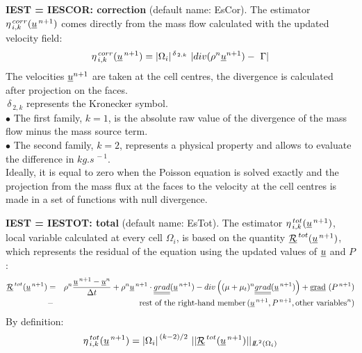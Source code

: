 {\bf IEST = IESCOR: correction}  (default name: EsCor).      
The estimator $ \eta^{\,corr}_{\,i,k}(\underline{u}^{\,n+1})$ comes directly
from the mass flow calculated with the updated velocity field:          
\begin{eqnarray*}
            \eta^{\,corr}_{\,i,k}(\vect{u}^{\,n+1})=
|\Omega_i|^{\,\delta_{\,2,k}}\ |div (\rho^n \vect{u}^{n+1}) -\ \Gamma|                          
\end{eqnarray*} 
The velocities $\underline{u}^{n+1}$ are taken at the cell centres,
the divergence is calculated after projection on the faces.\\
            $ \,\delta_{\,2,k}$ represents the Kronecker symbol.\\
\hspace*{0.5cm}$\bullet$ The first family, $k=1$, is the absolute raw
value of the divergence of the mass flow minus the mass source term.\\
\hspace*{0.5cm}$\bullet$ The second family, $k=2$, represents a physical
property and allows to evaluate the difference in $kg.s^{\,-1}$.\\
Ideally, it is equal to zero when the Poisson equation is solved exactly and
the projection from the mass flux at the faces to the velocity at the cell
centres is made in a set of  functions with null divergence.
                             
{\bf IEST = IESTOT: total} (default name: EsTot). 
The estimator $ \eta^{\,tot}_{\,i,k}(\underline{u}^{\,n+1})$, local variable
calculated at every cell $\Omega_i$, is based on the quantity
$\underline{\mathcal R}^{\,tot}(\underline{u}^{\,n+1})$, which represents the
residual of the equation using the updated values of
$\underline{u}$ and $P$:  
\begin{eqnarray*}
\underline{\mathcal R}^{\,tot}(\underline{u}^{\,n+1})&= & \rho^n \frac{\underline{u}^{\,n+1}-\underline{u}^n}{\Delta t} 
              + \rho^n \underline{u}^{\,n+1} \cdot \underline{\underline{grad}}(\underline{u}^{\,n+1})        
              - div \left((\mu+\mu_t)^n \underline{\underline{grad}}(\underline{u}^{\,n+1}) \right)
              + \text{g}\underline{\text{rad}}\ (P^{\,n+1})     \\
              &- &\text{rest of the right-hand member} 
                        \,(\underline{u}^{\,n+1}, P^{\,n+1}, \text{other variables}^n)
\end{eqnarray*}
By definition: 
$$ \eta^{\,tot}_{\,i,k}(\underline{u}^{\,n+1})= {|\Omega_i|}^{\,(k-2)/2}\ ||\underline{\mathcal R}^{\,tot}(\underline{u}^{\,n+1})||
_{{I\hspace{-.25em}L}^{2}(\Omega_i)}$$

